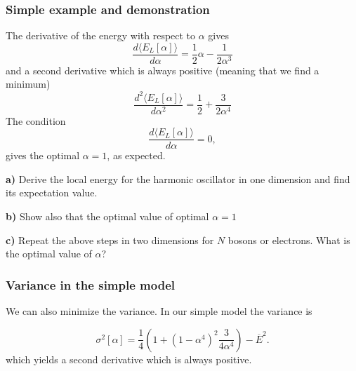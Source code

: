 \documentclass{beamer}
\newenvironment{doconceexercise}{}{}
\newcounter{doconceexercisecounter}
\newcounter{doconce:movie:counter}
\newcommand{\subex}[1]{\noindent\textbf{#1}}  %
\begin{document}
\begin{frame}
\frametitle{Simple example and demonstration}

\begin{block}{}
The derivative of the energy with respect to $\alpha$ gives
\begin{equation*}
\frac{d\langle  E_L[\alpha]\rangle}{d\alpha} = \frac{1}{2}\alpha-\frac{1}{2\alpha^3}
\end{equation*}
and a second derivative which is always positive (meaning that we find a minimum)
\begin{equation*}
\frac{d^2\langle  E_L[\alpha]\rangle}{d\alpha^2} = \frac{1}{2}+\frac{3}{2\alpha^4}
\end{equation*}
The condition
\begin{equation*}
\frac{d\langle  E_L[\alpha]\rangle}{d\alpha} = 0,
\end{equation*}
gives the optimal $\alpha=1$, as expected.
\end{block}
\end{frame}

\begin{frame}

\begin{doconceexercise}

                             

\subex{a)}
Derive the local energy for the harmonic oscillator in one dimension and find its expectation value.


\subex{b)}
Show also that the optimal value of optimal $\alpha=1$


\subex{c)}
Repeat the above steps in two dimensions for $N$ bosons or electrons. What is the optimal value of $\alpha$?


\end{doconceexercise}
\end{frame}

\begin{frame}
\frametitle{Variance in the simple model}

\begin{block}{}
We can also minimize the variance. In our simple model the variance is

\[
\sigma^2[\alpha]=\frac{1}{4}\left(1+(1-\alpha^4)^2\frac{3}{4\alpha^4}\right)-\overline{E}^2.
\]
which yields a second derivative which is always positive.
\end{block}
\end{frame}
\end{document}
